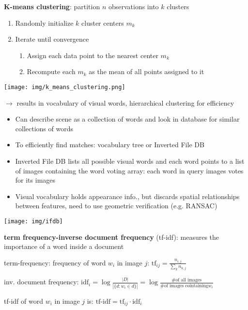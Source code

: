 \documentclass[fontsize=6pt]{scrartcl}
\begin{document}
\begin{multicols*}{4}
\begin{minipage}[b]{0.5\linewidth}
\textbf{K-means clustering}: partition $n$ observations into $k$ clusters
\begin{enumerate}
	\item Randomly initialize $k$ cluster centers $m_k$
	\item Iterate until convergence
	\begin{enumerate}
		\item Assign each data point to the nearest center $m_k$
		\item Recompute each $m_k$ as the mean of all points assigned to it
	\end{enumerate}
\end{enumerate}
\end{minipage}%
\begin{minipage}[b]{0.5\linewidth}
	\texttt{[image: img/k\_means\_clustering.png]}
\end{minipage}
$\rightarrow$ results in vocabulary of visual words, hierarchical clustering for efficiency
\begin{itemize}
	\item Can describe scene as a collection of words and look in database for similar collections of words
	\item To efficiently find matches: vocabulary tree or Inverted File DB
	\item Inverted File DB lists all possible visual words and each word points to a list of images containing the word
	voting array: each word in query images votes for its images
	\item Visual vocabulary holds appearance info., but discards spatial relationships between features, need to use geometric verification (e.g. RANSAC)
\end{itemize}

\texttt{[image: img/ifdb]}

\textbf{term frequency-inverse document frequency} (tf-idf): measures the importance of a word inside a document

term-frequency: frequency of word $w_i$ in image $j$: $\text{tf}_{ij} = \frac{n_{i,j}}{\sum_k n_{k,j}}$

inv. document frequency: $\text{idf}_i = \log \frac{|D|}{|\{d:w_i\in d\}|} = \log \frac{\text{\# of all images}}{\text{\# of images cointaining} w_i}$

tf-idf of word $w_i$ in image $j$ is: $\text{tf-idf} = \text{tf}_{ij}\cdot \text{idf}_i$


\end{multicols*}
\end{document}
